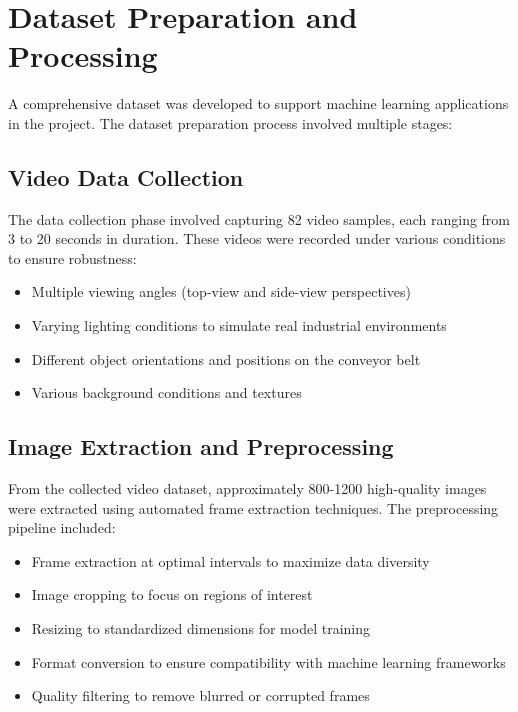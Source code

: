 \documentclass{book}
\begin{document}
\section{Dataset Preparation and Processing}

\par\noindent A comprehensive dataset was developed to support machine learning applications in the project. The dataset preparation process involved multiple stages:

\subsection{Video Data Collection}
\par\noindent The data collection phase involved capturing 82 video samples, each ranging from 3 to 20 seconds in duration. These videos were recorded under various conditions to ensure robustness:

\begin{itemize}
\item Multiple viewing angles (top-view and side-view perspectives)
\item Varying lighting conditions to simulate real industrial environments
\item Different object orientations and positions on the conveyor belt
\item Various background conditions and textures
\end{itemize}

\subsection{Image Extraction and Preprocessing}
\par\noindent From the collected video dataset, approximately 800-1200 high-quality images were extracted using automated frame extraction techniques. The preprocessing pipeline included:

\begin{itemize}
\item Frame extraction at optimal intervals to maximize data diversity
\item Image cropping to focus on regions of interest
\item Resizing to standardized dimensions for model training
\item Format conversion to ensure compatibility with machine learning frameworks
\item Quality filtering to remove blurred or corrupted frames
\end{itemize}
\end{document}
